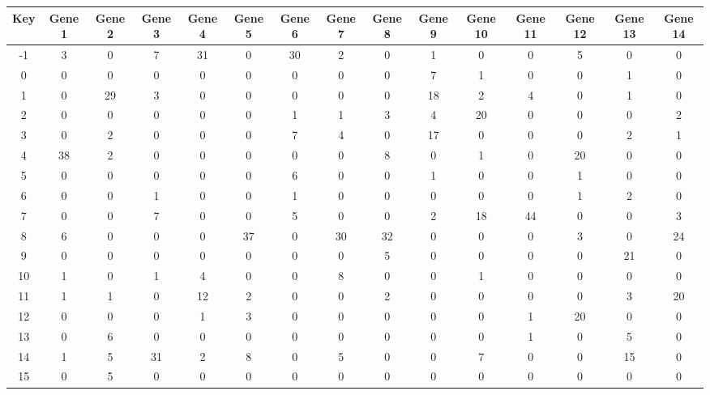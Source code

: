 \begin{tabular}{|c|c|c|c|c|c|c|c|c|c|c|c|c|c|c|}
\hline
Key & Gene 1 & Gene 2 & Gene 3 & Gene 4 & Gene 5 & Gene 6 & Gene 7 & Gene 8 & Gene 9 & Gene 10 & Gene 11 & Gene 12 & Gene 13 & Gene 14 \\
\hline
-1 & 3 & 0 & 7 & 31 & 0 & 30 & 2 & 0 & 1 & 0 & 0 & 5 & 0 & 0 \\
0 & 0 & 0 & 0 & 0 & 0 & 0 & 0 & 0 & 7 & 1 & 0 & 0 & 1 & 0 \\
1 & 0 & 29 & 3 & 0 & 0 & 0 & 0 & 0 & 18 & 2 & 4 & 0 & 1 & 0 \\
2 & 0 & 0 & 0 & 0 & 0 & 1 & 1 & 3 & 4 & 20 & 0 & 0 & 0 & 2 \\
3 & 0 & 2 & 0 & 0 & 0 & 7 & 4 & 0 & 17 & 0 & 0 & 0 & 2 & 1 \\
4 & 38 & 2 & 0 & 0 & 0 & 0 & 0 & 8 & 0 & 1 & 0 & 20 & 0 & 0 \\
5 & 0 & 0 & 0 & 0 & 0 & 6 & 0 & 0 & 1 & 0 & 0 & 1 & 0 & 0 \\
6 & 0 & 0 & 1 & 0 & 0 & 1 & 0 & 0 & 0 & 0 & 0 & 1 & 2 & 0 \\
7 & 0 & 0 & 7 & 0 & 0 & 5 & 0 & 0 & 2 & 18 & 44 & 0 & 0 & 3 \\
8 & 6 & 0 & 0 & 0 & 37 & 0 & 30 & 32 & 0 & 0 & 0 & 3 & 0 & 24 \\
9 & 0 & 0 & 0 & 0 & 0 & 0 & 0 & 5 & 0 & 0 & 0 & 0 & 21 & 0 \\
10 & 1 & 0 & 1 & 4 & 0 & 0 & 8 & 0 & 0 & 1 & 0 & 0 & 0 & 0 \\
11 & 1 & 1 & 0 & 12 & 2 & 0 & 0 & 2 & 0 & 0 & 0 & 0 & 3 & 20 \\
12 & 0 & 0 & 0 & 1 & 3 & 0 & 0 & 0 & 0 & 0 & 1 & 20 & 0 & 0 \\
13 & 0 & 6 & 0 & 0 & 0 & 0 & 0 & 0 & 0 & 0 & 1 & 0 & 5 & 0 \\
14 & 1 & 5 & 31 & 2 & 8 & 0 & 5 & 0 & 0 & 7 & 0 & 0 & 15 & 0 \\
15 & 0 & 5 & 0 & 0 & 0 & 0 & 0 & 0 & 0 & 0 & 0 & 0 & 0 & 0 \\
\hline
\end{tabular}
